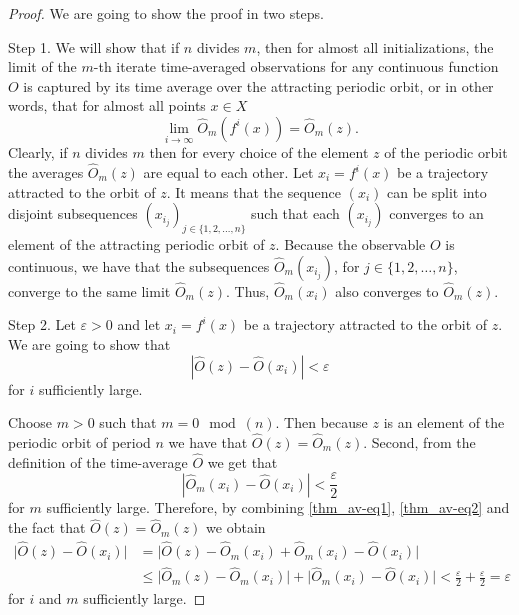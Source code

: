 \documentclass[format=acmsmall, authorversion, screen=true]{acmart}
\def\R{\ensuremath{\mathbb{R}}}
\begin{document}
\begin{proof}
We are going to show the proof in two steps.

Step 1. We will show that if $n$ divides $m$, then for almost all initializations, the limit of the $m$-th iterate time-averaged observations for any continuous function $O$ is captured by its time average over the attracting periodic orbit, or in other words, that
for almost all points $x \in X$
\begin{equation}\label{thm_av-eq1}
\lim_{i \rightarrow \infty} \hat{O}_m(f^i(x)) =  \hat{O}_m(z).
\end{equation}
Clearly, if $n$ divides $m$ then for every choice of the element $z$
of the periodic orbit the averages $\hat{O}_m(z)$ are equal to each
other. Let $x_i = f^i(x)$ be a trajectory attracted to the orbit of
$z$. It means that the sequence $(x_i)$ can be split into disjoint
subsequences $(x_{i_j})_{j \in \{1,2,\ldots,n\}}$ such that each
$(x_{i_j})$ converges to an element of the attracting periodic orbit
of $z$. Because the observable $O$ is continuous, we have that the
subsequences $\hat{O}_m(x_{i_j})$, for $j \in \{1,2,\ldots,n\}$,
converge to the same limit $\hat{O}_m(z)$. 
Thus, $\hat{O}_m(x_{i})$ also converges to $\hat{O}_m(z)$.

Step 2. Let $\varepsilon > 0$ and let $x_i = f^i(x)$ be a trajectory attracted to the orbit of
$z$. We are going to show that
\[
 | \hat{O}(z) - \hat{O}(x_i) | < \varepsilon
\]
for $i$ sufficiently large.

Choose $m>0$ such that $m=0 \mod (n)$.  Then because $z$ is an element of the periodic orbit of period $n$ we have that $\hat{O}(z) = \hat{O}_m(z)$.
Second, from the definition of the time-average $\hat{O}$ we get that
\begin{equation}\label{thm_av-eq2}
 | \hat{O}_m (x_i) - \hat{O} (x_i) | < \frac{\varepsilon}{2}
\end{equation}
for $m$ sufficiently large. Therefore, by combining \eqref{thm_av-eq1}, \eqref{thm_av-eq2} and the fact that $\hat{O}(z) = \hat{O}_m(z)$ we obtain
\begin{align*}
 \big| \hat{O} (z) - \hat{O} (x_i) \big| &= \big| \hat{O} (z) - \hat{O}_m (x_i) + \hat{O}_m (x_i) - \hat{O} (x_i) \big| \\
 &\leqslant \big| \hat{O}_m (z) - \hat{O}_m (x_i) \big| +  \big| \hat{O}_m (x_i) - \hat{O} (x_i) \big| < \frac{\varepsilon}{2} + \frac{\varepsilon}{2} = \varepsilon
\end{align*}
for $i$ and $m$ sufficiently large.
\end{proof}
\end{document}
